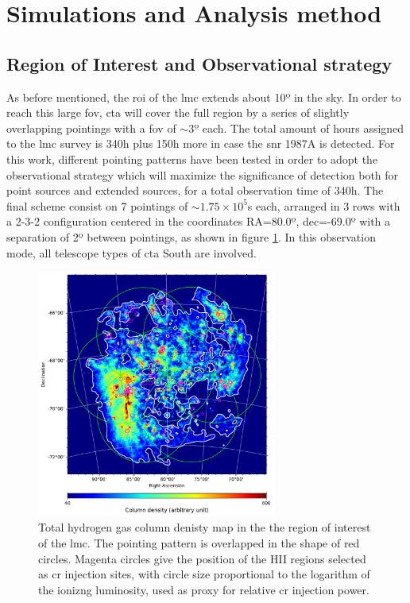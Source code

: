 \documentclass[main.tex]{subfiles}
\begin{document}
\section{Simulations and Analysis method} \label{sec:simana}

\subsection{Region of Interest and Observational strategy}

As before mentioned, the  \gls{roi} of the \gls{lmc} extends about 10º in the sky. In order to reach this large \gls{fov}, \gls{cta} will cover the full region by a series of slightly overlapping pointings with a \gls{fov} of $\sim 3º$ each. The total amount of hours assigned to the \gls{lmc} survey is 340h plus 150h more in case the \gls{snr} 1987A is detected. For this work, different pointing patterns have been tested in order to adopt the observational strategy which will maximize the significance of detection both for point sources and extended sources, for a total observation time of 340h. The final scheme consist on 7 pointings of $\sim 1.75 \times 10^5$s each, arranged in 3 rows with a 2-3-2 configuration centered in the coordinates RA=80.0º, dec=-69.0º with a separation of 2º between pointings, as shown in figure \ref{fig:pointings}. In this observation mode, all telescope types of \gls{cta} South are involved.

\begin{figure}[h]
  \centering
  \includegraphics[width=0.7\textwidth]{Pictures/map_pointings_data.pdf}
  \caption{\label{fig:pointings} Total hydrogen gas column denisty map in the the region of interest of the \gls{lmc}. The pointing pattern is overlapped in the shape of red circles. Magenta circles give the position of the HII regions selected as \gls{cr} injection sites, with circle size proportional to the logarithm of the ionizng luminosity, used as proxy for relative \gls{cr} injection power.}
\end{figure}
\end{document}
